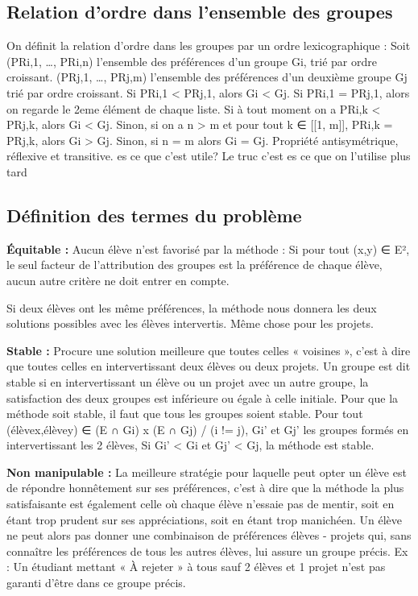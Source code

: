 \documentclass{article}
\begin{document}
\subsection{Relation d’ordre dans l’ensemble des groupes}
On définit la relation d’ordre dans les groupes par un ordre lexicographique : 
Soit (PRi,1, …, PRi,n) l’ensemble des préférences d’un groupe Gi, trié par ordre croissant.
(PRj,1, …, PRj,m) l’ensemble des préférences d’un deuxième groupe Gj trié par ordre croissant.
Si PRi,1 < PRj,1, alors Gi < Gj.
Si PRi,1 = PRj,1, alors on regarde le 2eme élément de chaque liste.
Si à tout moment on a PRi,k < PRj,k, alors Gi < Gj.
Sinon, si on a n > m et pour tout k ∈ [[1, m]], PRi,k = PRj,k, alors Gi > Gj. 
Sinon, si n = m alors Gi = Gj.
Propriété antisymétrique, réflexive et transitive.  es ce que c’est utile? Le truc c’est es ce que on  l’utilise plus tard


\subsection{Définition des termes du problème}

\textbf{Équitable :} Aucun élève n'est favorisé par la méthode :
Si pour tout (x,y) ∈ E², le seul facteur de l’attribution des groupes est la préférence de chaque élève, aucun autre critère ne doit entrer en compte.

Si deux élèves ont les même préférences, la méthode nous donnera les deux solutions possibles avec les élèves intervertis.
Même chose pour les projets. \par

\textbf{Stable :} Procure une solution meilleure que toutes celles « voisines », c'est à dire que toutes celles en intervertissant deux élèves ou deux projets.
Un groupe est dit stable si en intervertissant un élève ou un projet avec un autre groupe, la satisfaction des deux groupes est inférieure ou égale à celle initiale.
Pour que la méthode soit stable, il faut que tous les groupes soient stable.
Pour tout (élèvex,élèvey) ∈ (E ∩ Gi) x (E ∩ Gj) / (i != j), Gi’ et Gj’ les groupes formés en intervertissant les 2 élèves, Si Gi’ < Gi et Gj’ < Gj, la méthode est stable. \par
\textbf{Non manipulable :}  La meilleure stratégie pour laquelle peut opter un élève est de répondre honnêtement sur ses préférences, c’est à dire que la méthode la plus satisfaisante est également celle où chaque élève n’essaie pas de mentir, soit en étant trop prudent sur ses appréciations, soit en étant trop manichéen. Un élève ne peut alors pas donner une combinaison de préférences élèves - projets qui, sans connaître les préférences de tous les autres élèves, lui assure un groupe précis.
Ex : Un étudiant mettant « À rejeter » à tous sauf 2 élèves et 1 projet n'est pas garanti d'être dans ce groupe précis. \par
\end{document}
